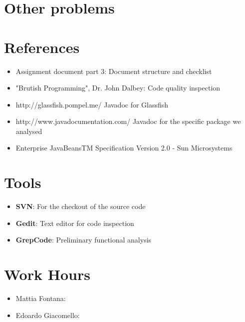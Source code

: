 \documentclass[11pt, a4paper,titlepage]{article}
\begin{document}
\section{Other problems}
\section{References}
	\begin{itemize}
		\item Assignment document part 3: Document structure and checklist
		\item "Brutish Programming", Dr. John Dalbey: Code quality inspection
		\item http://glassfish.pompel.me/ Javadoc for Glassfish
		\item http://www.javadocumentation.com/ Javadoc for the specific package we analysed
		\item Enterprise JavaBeansTM Specification Version 2.0 - Sun Microsystems 
	\end{itemize}
\section{Tools}
	\begin{itemize}
		\item \textbf{SVN}: For the checkout of the source code
		\item \textbf{Gedit}: Text editor for code inspection
		\item \textbf{GrepCode}: Preliminary functional analysis
	\end{itemize}
\section{Work Hours}
	\begin{itemize}
		\item Mattia Fontana:
		\item Edoardo Giacomello: 
	\end{itemize}
\end{document}
